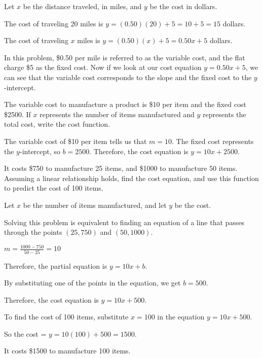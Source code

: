 \begin{solution}
Let $x$ be the distance traveled, in miles, and $y$ be the cost in dollars.

The cost of traveling 20 miles is $y = (0.50)(20) + 5 = 10 + 5 = 15$ dollars.

The cost of traveling $x$ miles is $y = (0.50)(x) + 5 = 0.50x + 5$ dollars.

In this problem, \$0.50 per mile is referred to as the variable cost, and the flat charge \$5 as the fixed cost.  Now if we look at our cost equation $y = 0.50x + 5$, we can see that the variable cost corresponds to the slope and the fixed cost to the $y$-intercept.
\end{solution}

\begin{example}
The variable cost to manufacture a product is \$10 per item and the fixed cost \$2500.  
If $x$ represents the number of items manufactured and $y$ represents the total cost, write the cost function.
\end{example}

\begin{solution}
The variable cost of \$10 per item tells us that $m = 10$.
The fixed cost represents the $y$-intercept, so $b = 2500$.
Therefore, the cost equation is $y = 10x + 2500$.
\end{solution}

\begin{example}
It costs \$750 to manufacture 25 items, and \$1000 to manufacture 50 items.  Assuming a linear relationship holds, find the cost equation, and use this function to predict the cost of 100 items.
\end{example}

\begin{solution}
Let $x$ be the number of items manufactured, and let $y$ be the cost.

Solving this problem is equivalent to finding an equation of a line that passes through the points $(25, 750)$ and $(50, 1000)$.  

$m = \frac{1000 - 750}{50 - 25} = 10$

Therefore, the partial equation is $y = 10x + b$.

By substituting one of the points in the equation, we get $b = 500$.

Therefore, the cost equation is $y = 10x + 500$.

To find the cost of 100 items, substitute $x = 100$ in the equation $y = 10x + 500$.

So the cost = $y = 10(100) + 500 = 1500$.

It costs \$1500 to manufacture 100 items.
\end{solution}

